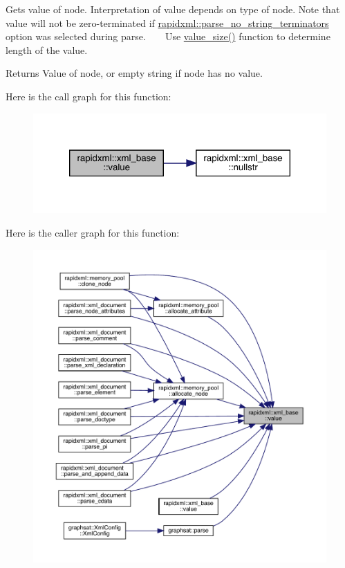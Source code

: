 Gets value of node. Interpretation of value depends on type of node. Note that value will not be zero-\/terminated if \mbox{\hyperlink{namespacerapidxml_af3fc88ba6bee33482a2db81b1da36ea1}{rapidxml\+::parse\+\_\+no\+\_\+string\+\_\+terminators}} option was selected during parse. ~\newline
~\newline
 Use \mbox{\hyperlink{classrapidxml_1_1xml__base_a2eb123d471b1567fa4832b6ee2b75493}{value\+\_\+size()}} function to determine length of the value. \begin{DoxyReturn}{Returns}
Value of node, or empty string if node has no value. 
\end{DoxyReturn}
Here is the call graph for this function\+:\nopagebreak
\begin{figure}[H]
\begin{center}
\leavevmode
\includegraphics[width=320pt]{classrapidxml_1_1xml__base_a6af65de5e59ac497cd69838f8a89d602_cgraph}
\end{center}
\end{figure}
Here is the caller graph for this function\+:\nopagebreak
\begin{figure}[H]
\begin{center}
\leavevmode
\includegraphics[width=350pt]{classrapidxml_1_1xml__base_a6af65de5e59ac497cd69838f8a89d602_icgraph}
\end{center}
\end{figure}
